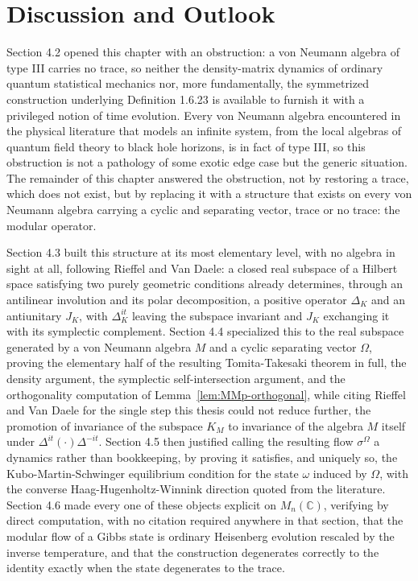 \section{Discussion and Outlook}\label{sec:discussion-ch4}

Section 4.2 opened this chapter with an obstruction: a von Neumann algebra of type III carries no trace, so neither the density-matrix dynamics of ordinary quantum statistical mechanics nor, more fundamentally, the symmetrized construction underlying Definition 1.6.23 is available to furnish it with a privileged notion of time evolution. Every von Neumann algebra encountered in the physical literature that models an infinite system, from the local algebras of quantum field theory to black hole horizons, is in fact of type III, so this obstruction is not a pathology of some exotic edge case but the generic situation. The remainder of this chapter answered the obstruction, not by restoring a trace, which does not exist, but by replacing it with a structure that exists on every von Neumann algebra carrying a cyclic and separating vector, trace or no trace: the modular operator.

Section 4.3 built this structure at its most elementary level, with no algebra in sight at all, following Rieffel and Van Daele: a closed real subspace of a Hilbert space satisfying two purely geometric conditions already determines, through an antilinear involution and its polar decomposition, a positive operator $\Delta_K$ and an antiunitary $J_K$, with $\Delta_K^{it}$ leaving the subspace invariant and $J_K$ exchanging it with its symplectic complement. Section 4.4 specialized this to the real subspace generated by a von Neumann algebra $M$ and a cyclic separating vector $\Omega$, proving the elementary half of the resulting Tomita-Takesaki theorem in full, the density argument, the symplectic self-intersection argument, and the orthogonality computation of Lemma~\ref{lem:MMp-orthogonal}, while citing Rieffel and Van Daele for the single step this thesis could not reduce further, the promotion of invariance of the subspace $K_M$ to invariance of the algebra $M$ itself under $\Delta^{it}(\cdot)\Delta^{-it}$. Section 4.5 then justified calling the resulting flow $\sigma^\Omega$ a dynamics rather than bookkeeping, by proving it satisfies, and uniquely so, the Kubo-Martin-Schwinger equilibrium condition for the state $\omega$ induced by $\Omega$, with the converse Haag-Hugenholtz-Winnink direction quoted from the literature. Section 4.6 made every one of these objects explicit on $M_n(\mathbb{C})$, verifying by direct computation, with no citation required anywhere in that section, that the modular flow of a Gibbs state is ordinary Heisenberg evolution rescaled by the inverse temperature, and that the construction degenerates correctly to the identity exactly when the state degenerates to the trace.


